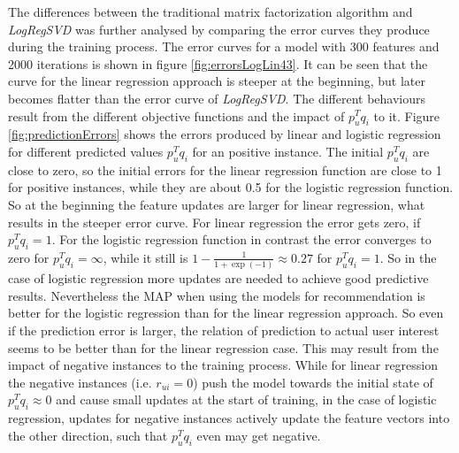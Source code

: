 \documentclass[10pt]{reportMaster}
\begin{document}
The differences between the traditional matrix factorization algorithm and \textit{LogRegSVD} was further analysed by comparing the error curves they produce during the training process.
The error curves for a model with 300 features and 2000 iterations is shown in figure \ref{fig:errorsLogLin43}.
It can be seen that the curve for the linear regression approach is steeper at the beginning, but later becomes flatter than the error curve of \textit{LogRegSVD}.
The different behaviours result from the different objective functions and the impact of $p_u^Tq_i$ to it.
Figure \ref{fig:predictionErrors} shows the errors produced by linear and logistic regression for different predicted values $p_u^Tq_i$ for an positive instance.
The initial $p_u^Tq_i$ are close to zero, so the initial errors for the linear regression function are close to 1 for positive instances, while they are about 0.5 for the logistic regression function.
So at the beginning the feature updates are larger for linear regression, what results in the steeper error curve.
For linear regression the error gets zero, if $p_u^Tq_i = 1$.
For the logistic regression function in contrast the error converges to zero for $p_u^Tq_i = \infty$, while it still is $1 - \frac{1}{1 + \exp(-1)} \approx 0.27$ for $p_u^Tq_i = 1$.
So in the case of logistic regression more updates are needed to achieve good predictive results.
Nevertheless the MAP when using the models for recommendation is better for the logistic regression than for the linear regression approach.
So even if the prediction error is larger, the relation of prediction to actual user interest seems to be better than for the linear regression case.
This may result from the impact of negative instances to the training process.
While for linear regression the negative instances (i.e. $r_{ui} = 0$) push the model towards the initial state of $p_u^Tq_i \approx 0$ and cause small updates at the start of training, in the case of logistic regression, updates for negative instances actively update the feature vectors into the other direction, such that $p_u^Tq_i$ even may get negative.

\FloatBarrier
\end{document}

